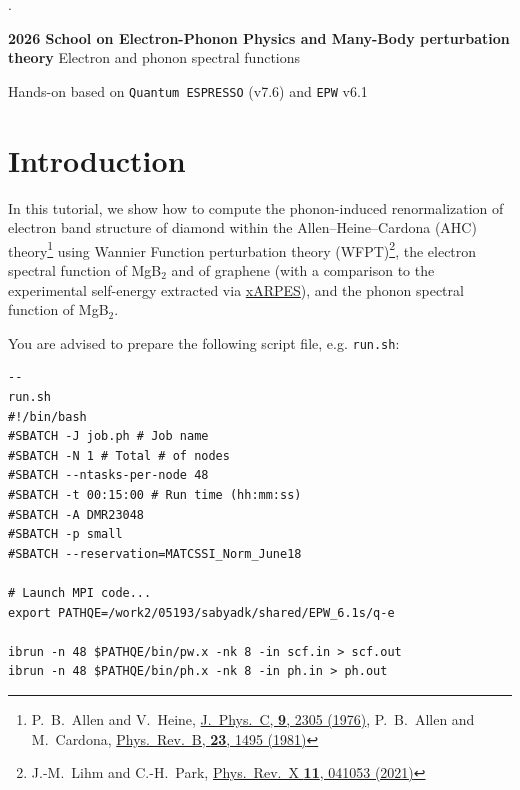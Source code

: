 \documentclass[a4paper,11pt,serif]{article}
\begin{document}
.\vspace{-0.97cm} %
\begin{tcolorbox}[width=\textwidth,colback=yellow!20,title={},colupper=black,
colframe=black,toprule=1.2pt,bottomrule=1.2pt,leftrule=1.2pt,rightrule=1.2pt,arc=0pt,outer arc=0pt]
\vspace{0.1cm}
{\color{blue2} \center \bf\large 2026 School on Electron-Phonon Physics and Many-Body perturbation theory}
\center\Large Electron and phonon spectral functions\vspace{-0.2cm}
\vspace{0.1cm}
\end{tcolorbox}
\vspace{-0.4cm}
\begin{flushright}
\footnotesize Hands-on based on \texttt{Quantum ESPRESSO} (v7.6) and \texttt{EPW} v6.1
\end{flushright}



\section*{Introduction}

In this tutorial, we show how to compute the phonon-induced renormalization of electron band structure of diamond within the Allen--Heine--Cardona (AHC) theory\footnote{P.\ B.\ Allen and V.\ Heine, \href{https://iopscience.iop.org/article/10.1088/0022-3719/9/12/013}{J.\ Phys.\ C, \textbf{9}, 2305 (1976)}, P.\ B.\ Allen and M.\ Cardona, \href{https://journals.aps.org/prb/abstract/10.1103/PhysRevB.23.1495}{Phys.\ Rev.\ B, \textbf{23}, 1495 (1981)}}
using Wannier Function perturbation theory (WFPT)\footnote{J.-M.\ Lihm and C.-H.\ Park, \href{https://journals.aps.org/prx/abstract/10.1103/PhysRevX.11.041053}{Phys.\ Rev.\ X \textbf{11}, 041053 (2021)}},
the electron spectral function of MgB$_2$ and of graphene (with a comparison to the experimental self-energy extracted via \href{https://xarpes.readthedocs.io/en/latest}{xARPES}), and the phonon spectral function of MgB$_2$.


You are advised to prepare the following script file, e.g. \texttt{run.sh}:
\begin{scriptsize}
 \begin{Verbatim}[frame=single]
--                                                                                                  run.sh
#!/bin/bash
#SBATCH -J job.ph # Job name
#SBATCH -N 1 # Total # of nodes
#SBATCH --ntasks-per-node 48
#SBATCH -t 00:15:00 # Run time (hh:mm:ss)
#SBATCH -A DMR23048
#SBATCH -p small
#SBATCH --reservation=MATCSSI_Norm_June18

# Launch MPI code...
export PATHQE=/work2/05193/sabyadk/shared/EPW_6.1s/q-e

ibrun -n 48 $PATHQE/bin/pw.x -nk 8 -in scf.in > scf.out
ibrun -n 48 $PATHQE/bin/ph.x -nk 8 -in ph.in > ph.out
\end{Verbatim}
\end{scriptsize}
\end{document}
